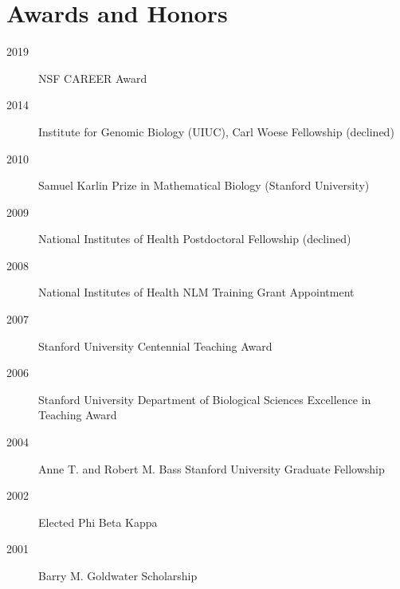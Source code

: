 \documentclass[11pt]{article}
\begin{document}
  \section{Awards and Honors}

  \begin{description}
  \item[2019] NSF CAREER Award
  \item[2014] Institute for Genomic Biology (UIUC), Carl Woese Fellowship (declined)
  \item[2010] Samuel Karlin Prize in Mathematical Biology (Stanford University) 
  \item[2009] National Institutes of Health Postdoctoral Fellowship (declined)
  \item[2008] National Institutes of Health NLM Training Grant Appointment
  \item[2007] Stanford University Centennial Teaching Award
  \item[2006] Stanford University Department of Biological Sciences Excellence in Teaching Award
  \item[2004] Anne T. and Robert M. Bass Stanford University Graduate Fellowship
  \item[2002] Elected Phi Beta Kappa
  \item[2001] Barry M. Goldwater Scholarship
  \end{description}
\end{document}
